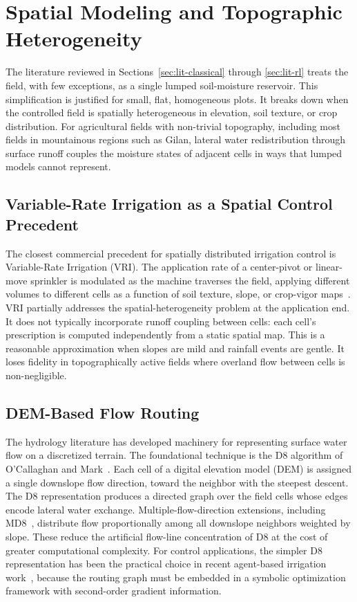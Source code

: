 \section{Spatial Modeling and Topographic Heterogeneity}
\label{sec:lit-spatial}

The literature reviewed in Sections~\ref{sec:lit-classical} through
\ref{sec:lit-rl} treats the field, with few exceptions, as a single
lumped soil-moisture reservoir. This simplification is justified for
small, flat, homogeneous plots. It breaks down when the controlled
field is spatially heterogeneous in elevation, soil texture, or crop
distribution. For agricultural fields with non-trivial topography,
including most fields in mountainous regions such as Gilan, lateral
water redistribution through surface runoff couples the moisture
states of adjacent cells in ways that lumped models cannot represent.

\subsection{Variable-Rate Irrigation as a Spatial Control Precedent}
\label{ssec:lit-vri}

The closest commercial precedent for spatially distributed irrigation
control is Variable-Rate Irrigation (VRI). The application rate of a
center-pivot or linear-move sprinkler is modulated as the machine
traverses the field, applying different volumes to different cells
as a function of soil texture, slope, or crop-vigor
maps~\cite{Sharma2025,Bayar2025}. VRI partially addresses the
spatial-heterogeneity problem at the application end. It does not
typically incorporate runoff coupling between cells: each cell's
prescription is computed independently from a static spatial map.
This is a reasonable approximation when slopes are mild and rainfall
events are gentle. It loses fidelity in topographically active
fields where overland flow between cells is non-negligible.

\subsection{DEM-Based Flow Routing}
\label{ssec:lit-flow-routing}

The hydrology literature has developed machinery for representing
surface water flow on a discretized terrain. The foundational
technique is the D8 algorithm of O'Callaghan and
Mark~\cite{ocallaghan1984d8}. Each cell of a digital elevation
model (DEM) is assigned a single downslope flow direction, toward
the neighbor with the steepest descent. The D8 representation
produces a directed graph over the field cells whose edges encode
lateral water exchange. Multiple-flow-direction extensions, including
MD8~\cite{quinn1991mfd}, distribute flow proportionally among all
downslope neighbors weighted by slope. These reduce the artificial
flow-line concentration of D8 at the cost of greater computational
complexity. For control applications, the simpler D8 representation
has been the practical choice in recent agent-based irrigation
work~\cite{Lopezjimenez2024,LopezJimenez2022}, because the routing
graph must be embedded in a symbolic optimization framework with
second-order gradient information.

